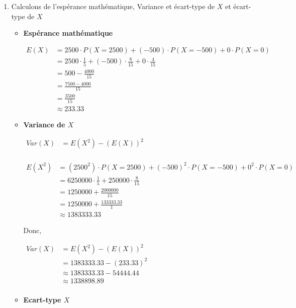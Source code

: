 \documentclass[12pt,a4paper]{article}
\begin{document}
\begin{enumerate}
\begin{enumerate}
    \item Calculons de l'espérance mathématique, Variance et écart-type de $X$ et écart-type de $X$
    \begin{itemize}
        \item \textbf{Espérance mathématique}
    
    \(
    \begin{aligned}
        E(X) &= 2500 \cdot P(X = 2500) + (-500) \cdot P(X = -500) + 0 \cdot P(X = 0)\\
             &= 2500 \cdot \frac{1}{5} + (-500) \cdot \frac{8}{15} + 0 \cdot \frac{4}{15}\\
             &= 500 - \frac{4000}{15}\\
             &= \frac{7500 - 4000}{15}\\
             &=\frac{3500}{15} \\
             &\approx 233.33
    \end{aligned}
    \)
    
        \item \textbf{Variance de $X$}

    \(
    \begin{aligned}
        Var(X) &= E(X^2) - (E(X))^2\\
    \end{aligned}
    \)

    \(
    \begin{aligned}
        E(X^2) &= (2500^2) \cdot P(X = 2500) + (-500)^2 \cdot P(X = -500) + 0^2 \cdot P(X = 0)\\
               &= 6250000 \cdot \frac{1}{5} + 250000 \cdot \frac{8}{15}\\
               &= 1250000 + \frac{2000000}{15}\\
               &= 1250000 + \frac{133333.33}{1}\\ 
               &\approx 1383333.33
    \end{aligned}
    \)
    
Donc, 

\(
    \begin{aligned}
        Var(X) &= E(X^2) - (E(X))^2\\
               &= 1383333.33 - (233.33)^2\\
               &\approx 1383333.33 - 54444.44\\
               &\approx 1338898.89\\ 
    \end{aligned}
\)

        \item  \textbf{Ecart-type $X$}


\end{itemize}
\end{enumerate}
\end{enumerate}
\end{document}
